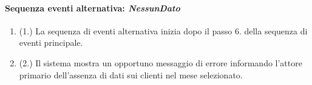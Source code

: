 \documentclass{article}
\begin{document}
		\paragraph{Sequenza eventi alternativa: \textit{NessunDato}}
	\begin{enumerate}	[leftmargin=28pt]
			\item  (1.) La sequenza di eventi alternativa inizia dopo il passo 6. della sequenza di eventi principale.
			\item  (2.) Il sistema mostra un opportuno messaggio di errore informando l'attore primario dell'assenza di dati sui clienti nel mese selezionato.
		\end{enumerate}








	
	
\end{document}
